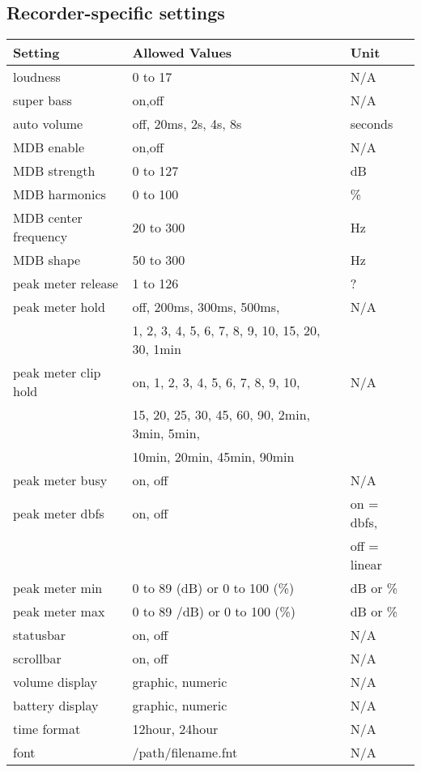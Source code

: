 \subsection{Recorder{}-specific settings}
\begin{center}
  \begin{longtable}{@{}lll@{}}\toprule
    \textbf{Setting} & \textbf{Allowed Values} & \textbf{Unit}\\\midrule
     loudness & 0 to 17 & N/A\\
     super bass & on,off & N/A\\
     auto volume & off, 20ms, 2s, 4s, 8s & seconds\\
     MDB enable & on,off & N/A\\
     MDB strength & 0 to 127 & dB\\
     MDB harmonics & 0 to 100 & \%\\
     MDB center frequency & 20 to 300 & Hz\\
     MDB shape & 50 to 300 & Hz\\
     peak meter release & 1 to 126 & ?\\
     peak meter hold & off, 200ms, 300ms, 500ms, & N/A \\
                     & 1, 2, 3, 4, 5, 6, 7, 8, 9, 10, 15, 20, 30, 1min & \\
     peak meter clip hold & on, 1, 2, 3, 4, 5, 6, 7, 8, 9, 10,& N/A \\
                     & 15, 20, 25, 30, 45, 60, 90, 2min, 3min, 5min, &\\
                     & 10min, 20min, 45min, 90min & \\
     peak meter busy & on, off & N/A\\
     peak meter dbfs & on, off & on = dbfs,\\
                     &         & off = linear\\
     peak meter min  & 0 to 89 (dB) or 0 to 100 (\%) & dB or \%\\
     peak meter max  & 0 to 89 /dB) or 0 to 100 (\%) & dB or \%\\
     statusbar & on, off & N/A\\
     scrollbar & on, off & N/A\\
     volume display & graphic, numeric & N/A\\
     battery display & graphic, numeric & N/A\\
     time format & 12hour, 24hour & N/A\\
     font & /path/filename.fnt & N/A\\

\end{longtable}
\end{center}
